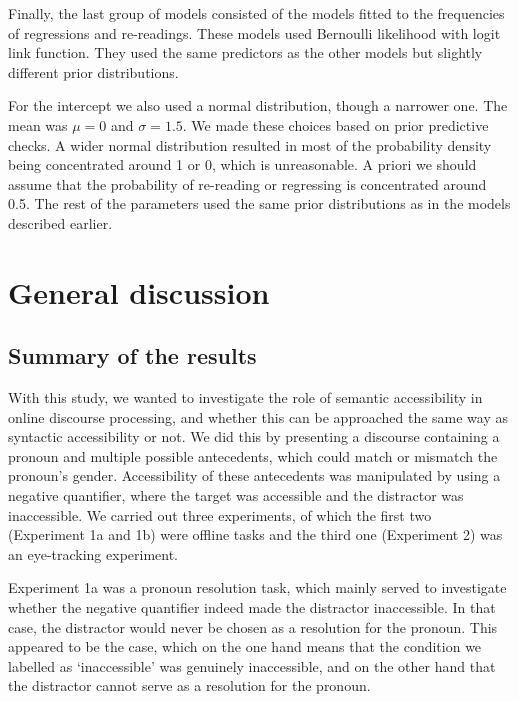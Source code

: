 \documentclass[11pt]{article} %
\begin{document}
Finally, the last group of models consisted of the models fitted to the
frequencies of regressions and re-readings. These models used Bernoulli
likelihood with logit link function. They used the same predictors as
the other models but slightly different prior distributions.

For the intercept we also used a normal distribution, though a narrower
one. The mean was \(\mu = 0\) and \(\sigma = 1.5\). We made these
choices based on prior predictive checks. A wider normal distribution
resulted in most of the probability density being concentrated around 1
or 0, which is unreasonable. A priori we should assume that the
probability of re-reading or regressing is concentrated around 0.5. The
rest of the parameters used the same prior distributions as in the
models described earlier.

\begin{comment}
ffdur
gdur
tgdur
rpdur
totfixdur
rr
rrdur
\end{comment}





\section{General discussion}
\subsection{Summary of the results}
With this study, we wanted to investigate the role of semantic accessibility in online discourse processing, and whether this can be approached the same way as syntactic accessibility or not. We did this by presenting a discourse containing a pronoun and multiple possible antecedents, which could match or mismatch the pronoun's gender. Accessibility of these antecedents was manipulated by using a negative quantifier, where the target was accessible and the distractor was inaccessible. We carried out three experiments, of which the first two (Experiment 1a and 1b) were offline tasks and the third one (Experiment 2) was an eye-tracking experiment. 

Experiment 1a was a pronoun resolution task, which mainly served to investigate whether the negative quantifier indeed made the distractor inaccessible. In that case, the distractor would never be chosen as a resolution for the pronoun. This appeared to be the case, which on the one hand means that the condition we labelled as `inaccessible' was genuinely inaccessible, and on the other hand that the distractor cannot serve as a resolution for the pronoun.
\end{document}
